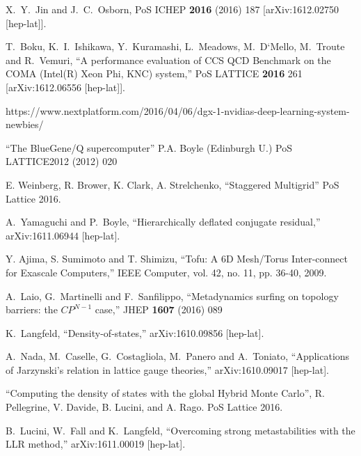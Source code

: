 \documentclass{PoS}
\begin{document}
\begin{thebibliography}{99}
 X.~Y.~Jin and J.~C.~Osborn,
  PoS ICHEP {\bf 2016} (2016) 187
  [arXiv:1612.02750 [hep-lat]].

  T.~Boku, K.~I.~Ishikawa, Y.~Kuramashi, L.~Meadows, M.~D`Mello, M.~Troute and R.~Vemuri,
  ``A performance evaluation of CCS QCD Benchmark on the COMA (Intel(R) Xeon Phi, KNC) system,''
  PoS LATTICE {\bf 2016} 261
  [arXiv:1612.06556 [hep-lat]].

https://www.nextplatform.com/2016/04/06/dgx-1-nvidias-deep-learning-system-newbies/

``The BlueGene/Q supercomputer'' P.A. Boyle (Edinburgh U.) PoS LATTICE2012 (2012) 020

E. Weinberg, R. Brower, K. Clark, A. Strelchenko, ``Staggered Multigrid'' PoS Lattice 2016.

 A.~Yamaguchi and P.~Boyle,
 ``Hierarchically deflated conjugate residual,''
  arXiv:1611.06944 [hep-lat].

Y. Ajima, S. Sumimoto and T. Shimizu, ``Tofu: A 6D Mesh/Torus Inter-connect for Exascale Computers,'' IEEE Computer, vol. 42, no. 11, pp. 36-40, 2009.

 A.~Laio, G.~Martinelli and F.~Sanfilippo,
 ``Metadynamics surfing on topology barriers: the $CP^{N−1}$ case,''
  JHEP {\bf 1607} (2016) 089

 K.~Langfeld,
 ``Density-of-states,''
  arXiv:1610.09856 [hep-lat].

 A.~Nada, M.~Caselle, G.~Costagliola, M.~Panero and A.~Toniato,
 ``Applications of Jarzynski's relation in lattice gauge theories,''
  arXiv:1610.09017 [hep-lat].

``Computing the density of states with the global Hybrid Monte Carlo'', 
R. Pellegrine, V. Davide, B. Lucini, and A. Rago. PoS Lattice 2016.

  B.~Lucini, W.~Fall and K.~Langfeld,
  ``Overcoming strong metastabilities with the LLR method,''
  arXiv:1611.00019 [hep-lat].


\end{thebibliography}
\end{document}

